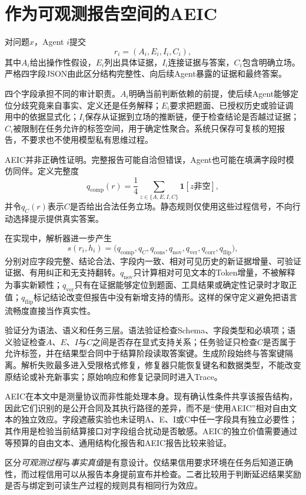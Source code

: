 \section{作为可观测报告空间的AEIC}\label{sec:aeic}
对问题$x$，Agent $i$提交
\begin{equation}r_i=(A_i,E_i,I_i,C_i),\end{equation}
其中$A_i$给出操作性假设，$E_i$列出具体证据，$I_i$连接证据与答案，$C_i$包含明确立场。严格四字段JSON由此区分结构完整性、向后续Agent暴露的证据和最终答案。

四个字段承担不同的审计职责。$A_i$明确当前判断依赖的前提，使后续Agent能够定位分歧究竟来自事实、定义还是任务解释；$E_i$要求把题面、已授权历史或验证调用中的依据显式化；$I_i$保存从证据到立场的推断链，便于检查结论是否越过证据；$C_i$被限制在任务允许的标签空间，用于确定性聚合。系统只保存可复核的短报告，不要求也不使用模型私有思维过程。

AEIC并非正确性证明。完整报告可能自洽但错误，Agent也可能在填满字段时模仿同伴。定义完整度
\begin{equation}q_{\mathrm{comp}}(r)=\frac{1}{4}\sum_{z\in\{A,E,I,C\}}\mathbf{1}[z\text{非空}],\end{equation}
并令$q_C(r)$表示$C$是否给出合法任务立场。静态规则仅使用这些过程信号，不向行动选择提示提供真实答案。

在实现中，解析器进一步产生
\begin{equation}
s(r_i,h_i)=\big(q_{\mathrm{comp}},q_C,q_{\mathrm{cons}},q_{\mathrm{nov}},q_{\mathrm{ver}},q_{\mathrm{corr}},q_{\mathrm{flip}}\big),
\end{equation}
分别对应字段完整、结论合法、字段内一致、相对可见历史的新证据增量、可验证证据、有用纠正和无支持翻转。$q_{\mathrm{nov}}$只计算相对可见文本的Token增量，不被解释为事实新颖性；$q_{\mathrm{ver}}$只有在证据能够定位到题面、工具结果或确定性记录时才取正值；$q_{\mathrm{flip}}$标记结论改变但报告中没有新增支持的情形。这样的保守定义避免把语言流畅度直接当作真实性。

验证分为语法、语义和任务三层。语法验证检查Schema、字段类型和必填项；语义验证检查$A$、$E$、$I$与$C$之间是否存在显式支持关系；任务验证只检查$C$是否属于允许标签，并在结果型合同中于结算阶段读取答案键。生成阶段始终与答案键隔离。解析失败最多进入受限格式修复，修复器只能恢复键名和数据类型，不能改变原结论或补充新事实；原始响应和修复记录同时进入Trace。

AEIC在本文中是测量协议而非性能处理本身。现有确认性条件共享该报告结构，因此它们识别的是公开合同及其执行路径的差异，而不是“使用AEIC”相对自由文本的独立效应。字段遮蔽实验也未证明A、E、I或C中任一字段具有独立必要性；其作用是检验当前结算接口对字段组合扰动是否敏感。AEIC的独立价值需要通过等预算的自由文本、通用结构化报告和AEIC报告比较来验证。

区分\emph{可观测过程}与\emph{事实真值}是有意设计。仅结果信用要求环境在任务后知道正确性，而过程信用可以从报告本身提前宣布并检查。二者比较用于判断延迟结果奖励是否与绑定到可读生产过程的规则具有相同行为效应。
